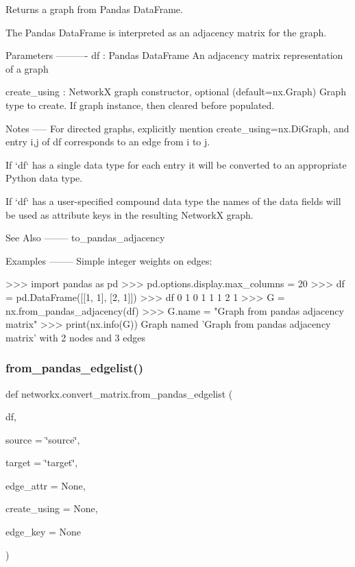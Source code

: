 \begin{DoxyVerb}Returns a graph from Pandas DataFrame.

The Pandas DataFrame is interpreted as an adjacency matrix for the graph.

Parameters
----------
df : Pandas DataFrame
  An adjacency matrix representation of a graph

create_using : NetworkX graph constructor, optional (default=nx.Graph)
   Graph type to create. If graph instance, then cleared before populated.

Notes
-----
For directed graphs, explicitly mention create_using=nx.DiGraph,
and entry i,j of df corresponds to an edge from i to j.

If `df` has a single data type for each entry it will be converted to an
appropriate Python data type.

If `df` has a user-specified compound data type the names
of the data fields will be used as attribute keys in the resulting
NetworkX graph.

See Also
--------
to_pandas_adjacency

Examples
--------
Simple integer weights on edges:

>>> import pandas as pd
>>> pd.options.display.max_columns = 20
>>> df = pd.DataFrame([[1, 1], [2, 1]])
>>> df
   0  1
0  1  1
1  2  1
>>> G = nx.from_pandas_adjacency(df)
>>> G.name = "Graph from pandas adjacency matrix"
>>> print(nx.info(G))
Graph named 'Graph from pandas adjacency matrix' with 2 nodes and 3 edges
\end{DoxyVerb}
 \mbox{\label{namespacenetworkx_1_1convert__matrix_a985798534d023762687a19185c0eb578}} 
\subsubsection{\texorpdfstring{from\+\_\+pandas\+\_\+edgelist()}{from\_pandas\_edgelist()}}
{\footnotesize\ttfamily def networkx.\+convert\+\_\+matrix.\+from\+\_\+pandas\+\_\+edgelist (\begin{DoxyParamCaption}\item[{}]{df,  }\item[{}]{source = {\ttfamily \char`\"{}source\char`\"{}},  }\item[{}]{target = {\ttfamily \char`\"{}target\char`\"{}},  }\item[{}]{edge\+\_\+attr = {\ttfamily None},  }\item[{}]{create\+\_\+using = {\ttfamily None},  }\item[{}]{edge\+\_\+key = {\ttfamily None} }\end{DoxyParamCaption})}

